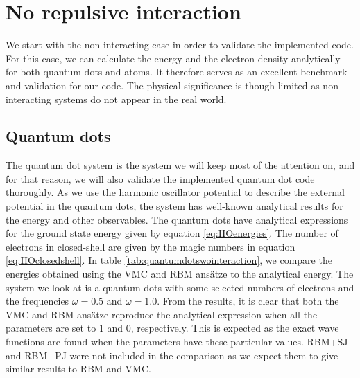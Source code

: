 \section{No repulsive interaction} \label{sec:norepulsive}
We start with the non-interacting case in order to validate the implemented code. For this case, we can calculate the energy and the electron density analytically for both quantum dots and atoms. It therefore serves as an excellent benchmark and validation for our code. The physical significance is though limited as non-interacting systems do not appear in the real world.

\subsection{Quantum dots} \label{sec:noninteractingquantumdots}
The quantum dot system is the system we will keep most of the attention on, and for that reason, we will also validate the implemented quantum dot code thoroughly. As we use the harmonic oscillator potential to describe the external potential in the quantum dots, the system has well-known analytical results for the energy and other observables. The quantum dots have analytical expressions for the ground state energy given by equation \eqref{eq:HOenergies}. The number of electrons in closed-shell are given by the magic numbers in equation \eqref{eq:HOclosedshell}. In table \eqref{tab:quantumdotswointeraction}, we compare the energies obtained using the VMC and RBM ansätze to the analytical energy. The system we look at is a quantum dots with some selected numbers of electrons and the frequencies $\omega=0.5$ and $\omega=1.0$. From the results, it is clear that both the VMC and RBM ansätze reproduce the analytical expression when all the parameters are set to 1 and 0, respectively. This is expected as the exact wave functions are found when the parameters have these particular values. RBM+SJ and RBM+PJ were not included in the comparison as we expect them to give similar results to RBM and VMC.

